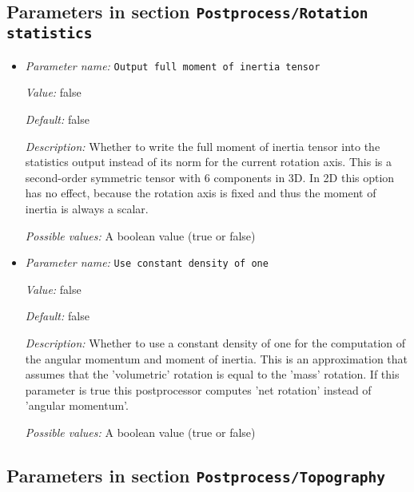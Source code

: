 \subsection{Parameters in section \tt Postprocess/Rotation statistics}
\label{parameters:Postprocess/Rotation_20statistics}

\begin{itemize}
\item {\it Parameter name:} {\tt Output full moment of inertia tensor}
\label{parameters:Postprocess/Rotation statistics/Output full moment of inertia tensor}


{\it Value:} false


{\it Default:} false


{\it Description:} Whether to write the full moment of inertia tensor into the statistics output instead of its norm for the current rotation axis. This is a second-order symmetric tensor with 6 components in 3D. In 2D this option has no effect, because the rotation axis is fixed and thus the moment of inertia is always a scalar.


{\it Possible values:} A boolean value (true or false)
\item {\it Parameter name:} {\tt Use constant density of one}
\label{parameters:Postprocess/Rotation statistics/Use constant density of one}


{\it Value:} false


{\it Default:} false


{\it Description:} Whether to use a constant density of one for the computation of the angular momentum and moment of inertia. This is an approximation that assumes that the 'volumetric' rotation is equal to the 'mass' rotation. If this parameter is true this postprocessor computes 'net rotation' instead of 'angular momentum'.


{\it Possible values:} A boolean value (true or false)
\end{itemize}

\subsection{Parameters in section \tt Postprocess/Topography}
\label{parameters:Postprocess/Topography}

